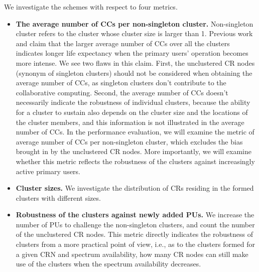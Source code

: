 \documentclass[10pt,journal,compsoc]{IEEEtran}
\theoremstyle{mytheoremstyle}
\theoremstyle{mytheoremstyle}
\theoremstyle{mytheoremstyle}
\newcommand{\eg}{e.g., }
\newcommand{\ie}{i.e., }
\begin{document}
We investigate the schemes with respect to four metrics.

\begin{itemize}
\item \textbf{The average number of CCs per non-singleton cluster.}
Non-singleton cluster refers to the cluster whose cluster size is larger than 1.
Previous work \cite{LIU_TMC11_2} and \cite{Li11_ROSS} claim that the larger average number of CCs over all the clusters indicates longer life expectancy when the primary users' operation becomes more intense.
We see two flaws in this claim.
First, the unclustered CR nodes (synonym of singleton clusters) should not be considered when obtaining the average number of CCs, as singleton clusters don't contribute to the collaborative computing.
Second, the average number of CCs doesn't necessarily indicate the robustness of individual clusters, because the ability for a cluster to sustain also depends on the cluster size and the locations of the cluster members, and this information is not illustrated in the average number of CCs.
In the performance evaluation, we will examine the metric of average number of CCs per non-singleton cluster, which excludes the bias brought in by the unclustered CR nodes.
More importantly, we will examine whether this metric reflects the robustness of the clusters against increasingly active primary users.



\item \textbf{Cluster sizes.}
We investigate the distribution of CRs residing in the formed clusters with different sizes.


\item \textbf{Robustness of the clusters against newly added PUs.}
We increase the number of PUs to challenge the non-singleton clusters, and count the number of the unclustered CR nodes.
This metric directly indicates the robustness of clusters from a more practical point of view, \ie as to the clusters formed for a given CRN and spectrum availability, how many CR nodes can still make use of the clusters when the spectrum availability decreases.



\end{itemize}
\end{document}
